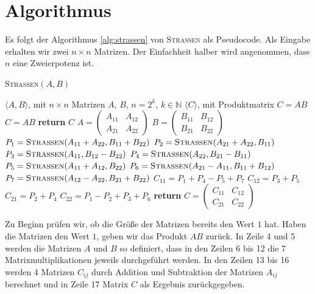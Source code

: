 \documentclass{scrartcl}
\begin{document}
\section{Algorithmus}
Es folgt der Algorithmus \ref{alg:strassen} von \textsc{Strassen}  als Pseudocode. Als Eingabe erhalten wir zwei $n \times n$ Matrizen. Der Einfachheit halber wird angenommen, dass $n$ eine Zweierpotenz ist.
\begin{algorithm}
	\caption{\textsc{Strassen}$(A, B)$}
	\label{alg:strassen}
	\begin{algorithmic}[1]
		\Require $\langle A, B \rangle$, mit $n \times n$ Matrizen $A$, $B$, $n = 2^k$, $k \in \mathbb{N}$
		\Ensure $\langle C \rangle$, mit Produktmatrix $C = AB$
		 $C = AB$ %
		\State \textbf{return} $C$
		\EndIf
		\State $A = \begin{pmatrix} A_{11} & A_{12} \\ A_{21} & A_{22} \end{pmatrix}$
		\State $B = \begin{pmatrix} B_{11} & B_{12} \\ B_{21} & B_{22} \end{pmatrix}$
		\State $P_1 = \textsc{Strassen}(A_{11} + A_{22}, B_{11} + B_{22})$
		\State $P_2 = \textsc{Strassen}(A_{21} + A_{22}, B_{11})$
		\State $P_3 = \textsc{Strassen}(A_{11}, B_{12} - B_{22})$
		\State $P_4 = \textsc{Strassen}(A_{22}, B_{21} - B_{11})$
		\State $P_5 = \textsc{Strassen}(A_{11} + A_{12}, B_{22})$
		\State $P_6 = \textsc{Strassen}(A_{21} - A_{11}, B_{11} + B_{12})$
		\State $P_7 = \textsc{Strassen}(A_{12} - A_{22}, B_{21} + B_{22})$
		\State $C_{11} = P_1 + P_4 - P_5 + P_7$
		\State $C_{12} = P_3 + P_5$
		\State $C_{21} = P_2 + P_4$
		\State $C_{22} = P_1 - P_2 + P_3 + P_6$
		\State \textbf{return} $C = \begin{pmatrix} C_{11} & C_{12} \\ C_{21} & C_{22} \end{pmatrix}$
	\end{algorithmic}
\end{algorithm}
Zu Beginn prüfen wir, ob die Größe der Matrizen bereits den Wert $1$ hat. Haben die Matrizen den Wert $1$, geben wir das Produkt $A B$ zurück. In Zeile 4 und 5 werden die Matrizen $A$ und $B$ so definiert, dass in den Zeilen 6 bis 12 die 7 Matrixmultiplikationen jeweils durchgeführt werden. In den Zeilen 13 bis 16 werden 4 Matrizen $C_{ij}$ durch Addition und Subtraktion der Matrizen $A_{ij}$ berechnet und in Zeile 17 Matrix $C$ als Ergebnis zurückgegeben.
\end{document}
